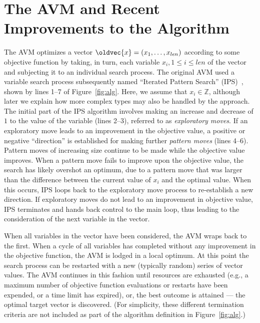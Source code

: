 \documentclass{llncs}
\let\vec\oldvec %
\newcommand{\inlineheading}[1]{\vspace{1mm} \noindent {\bf #1.}}
\begin{document}
\section{The AVM and Recent Improvements to the Algorithm}
\vspace{-1em}
\inlineheading{The Original AVM} The AVM optimizes a vector $\vec{x} = (x_1, \dots, x_{len})$ according to some objective function by taking, in turn, each variable $x_i, 1 \leq i \leq len$ of the vector and subjecting it to an individual search process. The original AVM used a variable search process subsequently named
``Iterated Pattern Search'' (IPS)~\cite{Kempka2013,Kempka2015}, shown by lines 1--7 of Figure~\ref{fig:alg}.
Here, we assume that $x_i \in \mathbb{Z}$, although later we explain how more complex types may also be handled by the approach.
The initial part of
the IPS algorithm involves making an increase and decrease of $1$ to the value of the variable (lines 2--3), referred to as
{\it exploratory moves}. If an exploratory move leads to an improvement in the objective value,
a positive or negative ``direction'' is established for making further {\it pattern moves\/} (lines 4--6). Pattern
moves of increasing size continue to be made while the objective value improves. When a pattern move fails to improve
upon the objective value, the search has likely overshot an optimum, due to a pattern move
that was larger than the difference between the current value of $x_i$ and the optimal value. When this occurs,
IPS loops back to the exploratory move process to re-establish a new direction. If exploratory moves do not lead to an
improvement in objective value, IPS terminates and hands back control to the main loop, thus leading to the consideration of the next variable in the vector.

When all variables in the vector have been considered, the AVM wraps back to the first. When a cycle of all variables has completed without any improvement in the objective function, the AVM is lodged in a local optimum. At this point the search process can be restarted with a new (typically random) series of vector values. The AVM continues in this fashion until resources are exhausted (e.g., a maximum number of objective function evaluations or restarts have been expended, or a time limit has expired), or, the best outcome is attained --- the optimal target vector is discovered. (For simplicity, these different termination criteria are not included as part of the algorithm definition in Figure~\ref{fig:alg}.)
\end{document}
